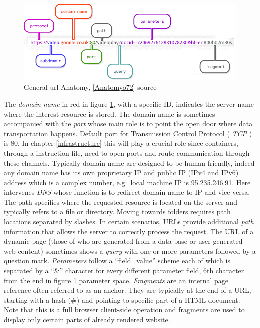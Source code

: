 \documentclass[
  12pt,
  a4paper,
  oneside]{book}
\theoremstyle{definition}
\theoremstyle{definition}
\theoremstyle{definition}
\theoremstyle{remark}
\begin{document}
\begin{figure}
\centering
\includegraphics{images/complex_url.png}
\caption{\label{fig:urlanatomy}General url Anatomy, \ref{Anatomyo72} source}
\end{figure}

The \emph{domain name} in red in figure \ref{fig:urlanatomy}, with a specific ID, indicates the server name where the interest resource is stored. The domain name is sometimes accompanied with the \emph{port} whose main role is to point the open door where data transportation happens. Default port for Transmission Control Protocol ( \emph{TCP} ) is 80. In chapter \ref{infrastructure} this will play a crucial role since containers, through a instruction file, need to open ports and route communication through these channels.
Typically domain name are designed to be human friendly, indeed any domain name has its own proprietary IP and public IP (IPv4 and IPv6) address which is a complex number, e.g.~local machine IP is 95.235.246.91. Here intervenes \emph{DNS} whose function is to redirect domain name to IP and vice versa. The path specifies where the requested resource is located on the server and typically refers to a file or directory. Moving towards folders requires path locations separated by slashes. In certain scenarios, URLs provide additional \emph{path} information that allows the server to correctly process the request. The URL of a dynamic page (those of who are generated from a data base or user-generated web content) sometimes shows a \emph{query} with one or more parameters followed by a question mark. \emph{Parameters} follow a ``field=value'' scheme each of which is separated by a ``\&'' character for every different parameter field, 6th character from the end in figure \ref{fig:urlanatomy} parameter space. \emph{Fragments} are an internal page reference often referred to as an anchor. They are typically at the end of a URL, starting with a hash (\#) and pointing to specific part of a HTML document. Note that this is a full browser client-side operation and fragments are used to display only certain parts of already rendered website.
\end{document}
